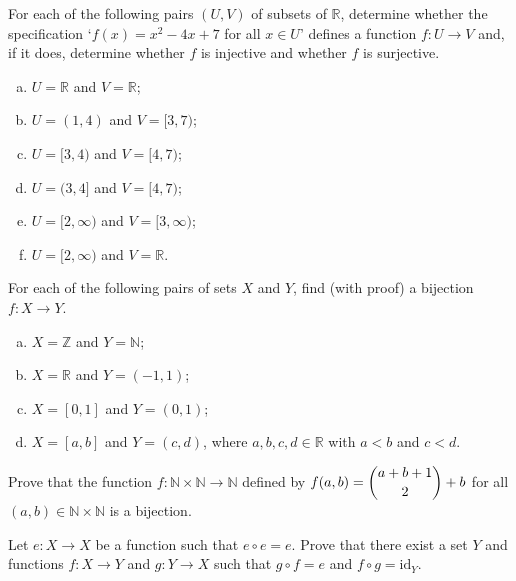\begin{chapex}
\label{cqInjectionSurjectionBijection}
For each of the following pairs $(U,V)$ of subsets of $\mathbb{R}$, determine whether the specification `$f(x) = x^2-4x+7$ for all $x \in U$' defines a function $f : U \to V$ and, if it does, determine whether $f$ is injective and whether $f$ is surjective.
\begin{multicols}{2}
\begin{enumerate}[(a)]
\item $U = \mathbb{R}$ and $V = \mathbb{R}$;
\item $U = (1, 4)$ and $V = [3, 7)$;
\item $U = [3, 4)$ and $V = [4, 7)$;
\item $U = (3, 4]$ and $V = [4, 7)$;
\item $U = [2, \infty)$ and $V = [3, \infty)$;
\item $U = [2,\infty)$ and $V = \mathbb{R}$.
\end{enumerate}
\end{multicols}
\end{chapex}

\begin{chapex}
For each of the following pairs of sets $X$ and $Y$, find (with proof) a bijection $f : X \to Y$.
\begin{enumerate}[(a)]
\item $X = \mathbb{Z}$ and $Y = \mathbb{N}$;
\item $X = \mathbb{R}$ and $Y = (-1,1)$;
\item $X = [0,1]$ and $Y = (0,1)$;
\item $X = [a,b]$ and $Y = (c,d)$, where $a,b,c,d \in \mathbb{R}$ with $a<b$ and $c<d$.
\end{enumerate}
\end{chapex}

\begin{chapex}
Prove that the function $f : \mathbb{N} \times \mathbb{N} \to \mathbb{N}$ defined by $f(a,b) = \dbinom{a+b+1}{2} + b$ for all $(a,b) \in \mathbb{N} \times \mathbb{N}$ is a bijection.
\end{chapex}

\begin{chapex}
Let $e : X \to X$ be a function such that $e \circ e = e$. Prove that there exist a set $Y$ and functions $f : X \to Y$ and $g : Y \to X$ such that $g \circ f = e$ and $f \circ g = \mathrm{id}_Y$.
\end{chapex}


